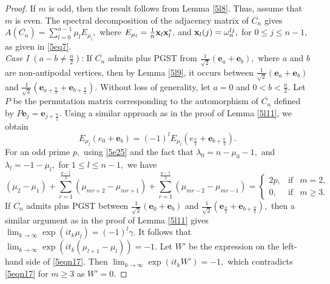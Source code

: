 \documentclass[12pt,a4paper]{article}
\def \e {{\bf e}}
\def \x {{\bf x}}
\def \e {{\mathbf e}}
\newcommand{\ob}[1]{\left(#1\right)}
\begin{document}
\begin{proof}
If $m$ is odd, then the result follows from Lemma \ref{5l8}. Thus, assume that $m$ is even. 
The spectral decomposition of the adjacency matrix of
 $\overline{C_n}$ gives $A(\overline{C_n})=\displaystyle\sum_{l=0}^{n-1}\mu_l E_{\mu_l},$ where   
     $E_{\mu_l}=\frac{1}{n}\x_l\x_l^*,$ and $\x_l(j)=\omega_n^{lj},$ for $0\leq j\leq n-1,$ as given in \eqref{5eq7}.
\\\textit{Case I} $(a-b\neq\frac{n}{2})$:   If  $\overline{C_n}$ admits plus PGST from $\frac{1}{\sqrt{2}}\ob{\e_a+\e_b},$ where $a$ and 
$b$ are non-antipodal vertices, then by Lemma \ref{5l9}, it occurs between $\frac{1}{\sqrt{2}}\ob{\e_a+\e_b}$ and $\frac{1}{\sqrt{2}}\ob{\e_{a+\frac{n}{2}}+\e_{b+\frac{n}{2}}}.$ Without loss of generality, let $a=0$ and $0<b<\frac{n}{2}.$
 Let $P$ be the permutation matrix corresponding to the automorphism of $\overline{C_n}$ defined by $P\e_j=\e_{j+\frac{n}{2}}.$ Using a similar approach as in the proof of Lemma \ref{5l11}, we obtain 
\begin{equation}\label{5eq33}
        E_{\mu_l}(e_0+\e_b)=(-1)^l E_{\mu_l}\ob{e_{\frac{n}{2}}+\e_{b+\frac{n}{2}}}.
         \end{equation}
         For an odd prime $p,$ using \eqref{5e25} and the fact that $\lambda_0=n-\mu_0-1,$ and $\lambda_l=-1-\mu_l,$ for $1 \leq l \leq n - 1,$ we have
  \begin{equation}\label{5eqn17}
    (\mu_2-\mu_1)+\sum_{r=1}^\frac{p-1}{2}(\mu_{mr+2}-\mu_{mr+1})+ \sum_{r=1}^\frac{p-1}{2}(\mu_{mr-2}-\mu_{mr-1})=\left\{ \begin{array}{rcl}
 2p, & \mbox{if} & m =2, \\ 
 0, & \mbox{if} & m\geq 3.
 \end{array}\right.
 \end{equation}
 If $\overline{C_n}$ admits plus PGST between $\frac{1}{\sqrt{2}}\ob{\e_0+\e_b}$ and $\frac{1}{\sqrt{2}}\ob{\e_{\frac{n}{2}}+\e_{b+\frac{n}{2}}},$ then a similar argument as in the proof of Lemma \ref{5l11} gives $\displaystyle\lim_{k \to \infty}\exp{(it_k\mu_l)}=(-1)^l\gamma.$ 
 It follows that
$ \displaystyle\lim_{k \to \infty}\exp{(it_k(\mu_{l+1}-\mu_l))}=-1. $ Let $W'$ be the expression on the left-hand side of \eqref{5eqn17}. Then  
  $\displaystyle\lim_{k \to \infty}\exp{\ob{it_kW'}}=-1,$ which contradicts \eqref{5eqn17} for $m\geq 3$ as $W'=0.$


\end{proof}
\end{document}
